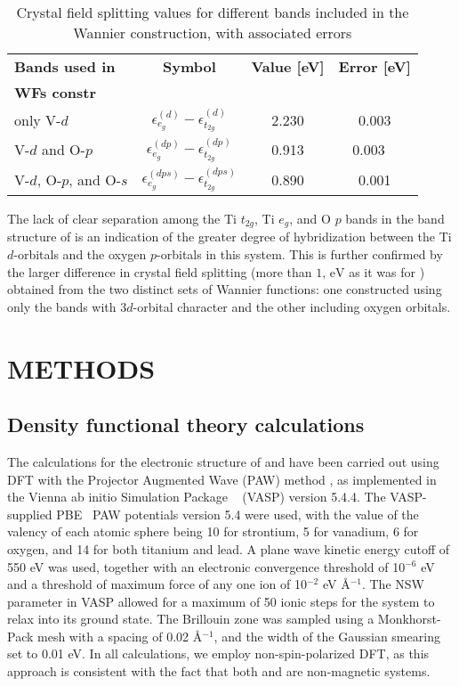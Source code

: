 \documentclass[%
 reprint,
 amsmath,amssymb,
 aps,
]{revtex4-2}
\begin{document}
\begin{table}[H]
\centering
\caption{Crystal field splitting values for different bands included in the Wannier construction, with associated errors}
\begin{tabular}{|l|c|c|c|}
\hline
\textbf{Bands used in} & \textbf{Symbol} & \textbf{Value [eV]} & \textbf{Error [eV]} \\ 
\textbf{WFs constr} & & & \\ \hline
only V-\(d\) & $\epsilon_{e_g}^{(d)} - \epsilon_{t_{2g}}^{(d)}$ & 2.230 & 0.003\\ \hline
V-\(d\) and O-\(p\) & $\epsilon_{e_g}^{(dp)} - \epsilon_{t_{2g}}^{(dp)}$ & 0.913 & 0.003 \ \\ \hline
V-\(d\), O-\(p\), and O-\(s\) & $\epsilon_{e_g}^{(dps)} - \epsilon_{t_{2g}}^{(dps)}$ &  0.890  &0.001 \\ \hline
\end{tabular}
\label{table:splitting-TiPbO3}
\end{table}
The lack of clear separation among the Ti \(t_{2g}\), Ti \(e_g\), and O \(p\) bands in the band structure of  is an indication of the greater degree of hybridization between the Ti \(d\)-orbitals and the oxygen \(p\)-orbitals in this system. This is further confirmed by the larger difference in crystal field splitting (more than \(1, \, \text{eV}\) as it was for ) obtained from the two distinct sets of Wannier functions: one constructed using only the bands with \(3d\)-orbital character and the other including oxygen orbitals. 


\section{METHODS}
\subsection*{Density functional theory calculations} 
 The calculations for the electronic structure of  and  have been carried out using DFT with the Projector Augmented Wave (PAW) method \cite{ProjectorAugmentedWaveMethod}, as implemented in the Vienna ab initio Simulation Package ~\cite{Kresse1993, Kresse1994, Kresse1996Efficiency, Kresse1996Efficient} (VASP) version 5.4.4.
 The VASP-supplied PBE~\cite{PBE1996} PAW potentials version 5.4 were used, with the value of the valency of each atomic sphere being 10 for strontium, 5 for vanadium, 6 for oxygen, and 14 for both titanium and lead. 
 A plane wave kinetic energy cutoff of 550 eV was used, together with an electronic convergence threshold of 10$^{-6}$ eV and a threshold of maximum force of any one ion of 10$^{-2}$ eV {\AA}$^{-1}$. The NSW parameter in VASP allowed for a maximum of 50 ionic steps for the system to relax into its ground state.
 The Brillouin zone was sampled using a Monkhorst-Pack mesh with a spacing of 0.02 {\AA}$^{-1}$, and the width of the Gaussian smearing set to 0.01 eV.
In all calculations, we employ non-spin-polarized DFT, as this approach is consistent with the fact that both  and  are non-magnetic systems.
\end{document}
